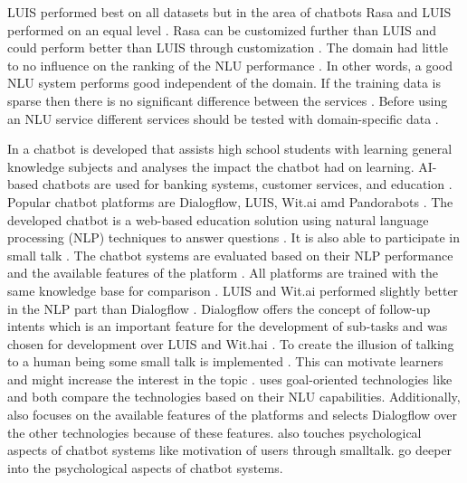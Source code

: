 LUIS performed best on all datasets but in the area of chatbots Rasa and LUIS performed on an equal level \cite{braunEvaluatingNLU}.
Rasa can be customized further than LUIS and could perform better than LUIS through customization \cite{braunEvaluatingNLU}. 
The domain had little to no influence on the ranking of the NLU performance \cite{braunEvaluatingNLU}.
In other words, a good NLU system performs good independent of the domain.
If the training data is sparse then there is no significant difference between the services \cite{braunEvaluatingNLU}. 
Before using an NLU service different services should be tested with domain-specific data \cite{braunEvaluatingNLU}.

In \citet{dutta2017developing} a chatbot is developed that assists high school students with learning general 
knowledge subjects and analyses the impact the chatbot had on learning.
AI-based chatbots are used for banking systems, customer services, and education \cite{dutta2017developing}.
Popular chatbot platforms are Dialogflow, LUIS, Wit.ai amd Pandorabots \cite{dutta2017developing}.
The developed chatbot is a web-based education solution using natural language processing (NLP) techniques
to answer questions \cite{dutta2017developing}.
It is also able to participate in small talk \cite{dutta2017developing}.
The chatbot systems are evaluated based on their NLP performance and the available features of the platform 
\cite{dutta2017developing}. 
All platforms are trained with the same knowledge base for comparison \cite{dutta2017developing}. 
LUIS and Wit.ai performed slightly better in the NLP part than Dialogflow \cite{dutta2017developing}.
Dialogflow offers the concept of follow-up intents which is an important feature for the development 
of sub-tasks and was chosen for development over LUIS and Wit.hai \cite{dutta2017developing}.
To create the illusion of talking to a human being some small talk is implemented \cite{dutta2017developing}. 
This can motivate learners and might increase the interest in the topic \cite{dutta2017developing}.
\citet{dutta2017developing} uses goal-oriented technologies like \citet{braunEvaluatingNLU} and 
both compare the technologies based on their NLU capabilities.
Additionally, \citet{dutta2017developing} also focuses on the available features of the 
platforms and selects Dialogflow over the other technologies because 
of these features.
\citet{dutta2017developing} also touches psychological aspects of chatbot systems 
like motivation of users through smalltalk. 
\citet{GO2019304, brandtzaeg2018chatbots,folstad2017chatbots} go deeper into the psychological aspects of chatbot systems.

